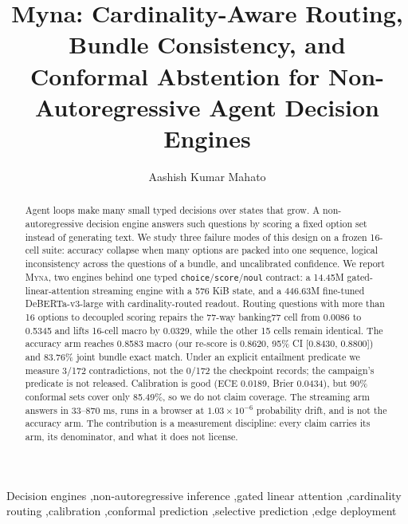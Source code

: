 \documentclass[final,3p,times,twocolumn]{elsarticle}
\newcommand{\myna}{\textsc{Myna}}
\begin{document}
\begin{frontmatter}
\title{Myna: Cardinality-Aware Routing, Bundle Consistency, and Conformal Abstention for Non-Autoregressive Agent Decision Engines}
\author[1]{Aashish Kumar Mahato}
\begin{abstract}
Agent loops make many small typed decisions over states that grow. A non-autoregressive decision engine answers such questions by scoring a fixed option set instead of generating text. We study three failure modes of this design on a frozen 16-cell suite: accuracy collapse when many options are packed into one sequence, logical inconsistency across the questions of a bundle, and uncalibrated confidence. We report \myna, two engines behind one typed \texttt{choice}/\texttt{score}/\texttt{noul} contract: a 14.45M gated-linear-attention streaming engine with a 576 KiB state, and a 446.63M fine-tuned DeBERTa-v3-large with cardinality-routed readout. Routing questions with more than 16 options to decoupled scoring repairs the 77-way banking77 cell from 0.0086 to 0.5345 and lifts 16-cell macro by 0.0329, while the other 15 cells remain identical. The accuracy arm reaches 0.8583 macro (our re-score is 0.8620, 95\% CI [0.8430, 0.8800]) and 83.76\% joint bundle exact match. Under an explicit entailment predicate we measure 3/172 contradictions, not the 0/172 the checkpoint records; the campaign's predicate is not released. Calibration is good (ECE 0.0189, Brier 0.0434), but 90\% conformal sets cover only 85.49\%, so we do not claim coverage. The streaming arm answers in 33--870 ms, runs in a browser at $1.03\times10^{-6}$ probability drift, and is not the accuracy arm. The contribution is a measurement discipline: every claim carries its arm, its denominator, and what it does not license.
\end{abstract}
\begin{keyword}
Decision engines \sep non-autoregressive inference \sep gated linear attention \sep cardinality routing \sep calibration \sep conformal prediction \sep selective prediction \sep edge deployment
\end{keyword}
\end{frontmatter}



\clearpage

\end{document}
